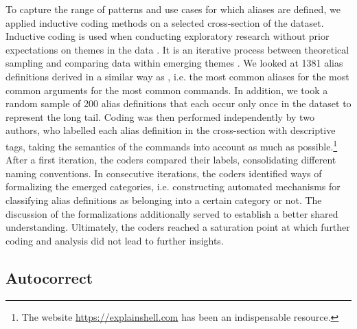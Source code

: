To capture the range of patterns and use cases for which aliases are defined, we applied inductive coding methods on a selected cross-section of the dataset.
Inductive coding is used when conducting exploratory research without prior expectations on themes in the data \cite{thomas:06}.
It is an iterative process between theoretical sampling and comparing data within emerging themes \cite{dey:03}.
We looked at 1381 alias definitions derived in a similar way as , i.e. the most common aliases for the most common arguments for the most common commands.
In addition, we took a random sample of 200 alias definitions that each occur only once in the dataset to represent the long tail.
Coding was then performed independently by two authors, who labelled each alias definition in the cross-section with descriptive tags, taking the semantics of the commands into account as much as possible.\footnote{The website \url{https://explainshell.com} has been an indispensable resource.}
After a first iteration, the coders compared their labels, consolidating different naming conventions.
In consecutive iterations, the coders identified ways of formalizing the emerged categories, i.e. constructing automated mechanisms for classifying alias definitions as belonging into a certain category or not.
The discussion of the formalizations additionally served to establish a better shared understanding.
Ultimately, the coders reached a saturation point at which further coding and analysis did not lead to further insights.


\TODO




%

\subsection{Autocorrect}


